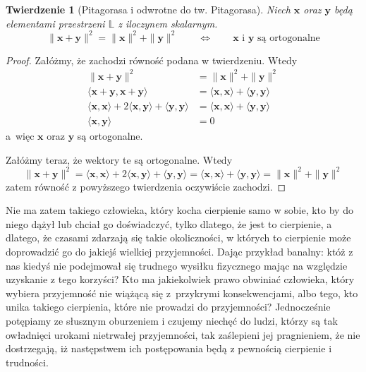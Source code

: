 \documentclass[12pt]{mwbk}
\theoremstyle{plain}
\newtheorem{twier}{Twierdzenie}[chapter] %
\theoremstyle{definition}
\theoremstyle{remark}
\newcommand{\xx}{\mathbf{x}}
\newcommand{\yy}{\mathbf{y}}
\newcommand{\skalar}[2]{\pmb{\langle}#1,#2\pmb{\rangle}}
\begin{document}
\begin{twier}[Pitagorasa i odwrotne do tw.
	Pitagorasa]\label{Pitagoras}
	Niech $\xx$ oraz $\yy$ będą elementami przestrzeni $\mathbb{L}$ z iloczynem
	skalarnym. 
	\[
	\|\xx+\yy\|^2=\|\xx\|^2 + \|\yy\|^2\qquad\iff\qquad
	\text{$\xx$ i $\yy$ są ortogonalne}
	\]
\end{twier}
\begin{proof}
	Załóżmy, że zachodzi równość podana w twierdzeniu. Wtedy
	\[
	\begin{aligned}
	\|\xx+\yy\|^2&=\|\xx\|^2+\|\yy\|^2\\
	\skalar{\xx+\yy}{\xx+\yy}
	&=\skalar{\xx}{\xx}+\skalar{\yy}{\yy}\\
	\skalar{\xx}{\xx}+2\skalar{\xx}{\yy}+\skalar{\yy}{\yy}
	&=\skalar{\xx}{\xx}+\skalar{\yy}{\yy}\\
	\skalar{\xx}{\yy}&=0
	\end{aligned}
	\]
	a~więc $\xx$ oraz $\yy$ są ortogonalne.

	Załóżmy teraz, że wektory te są ortogonalne. Wtedy
	\[
	\|\xx+\yy\|^2=
	\skalar{\xx}{\xx}+2\skalar{\xx}{\yy}+\skalar{\yy}{\yy}
	=\skalar{\xx}{\xx}+\skalar{\yy}{\yy}=
	\|\xx\|^2+\|\yy\|^2
	\]
	zatem równość z powyższego twierdzenia oczywiście zachodzi.
\end{proof}




Nie ma zatem takiego człowieka, który kocha cierpienie samo w sobie, 
kto by do niego dążył lub chciał go doświadczyć, tylko dlatego, że
jest to cierpienie, a dlatego, że czasami zdarzają się takie 
okoliczności, w których to cierpienie może doprowadzić 
go do jakiejś wielkiej przyjemności. 
Dając przykład banalny: któż z nas kiedyś nie podejmował 
się trudnego wysiłku fizycznego mając na względzie 
uzyskanie z tego korzyści? 
Kto ma jakiekolwiek prawo obwiniać człowieka, 
który wybiera przyjemność nie wiążącą się z~przykrymi 
konsekwencjami, albo tego, kto unika takiego cierpienia, 
które nie prowadzi do przyjemności? 
Jednocześnie potępiamy ze słusznym oburzeniem i czujemy 
niechęć do ludzi, którzy są tak owładnięci urokami nietrwałej 
przyjemności, tak zaślepieni jej pragnieniem, 
że nie dostrzegają, iż następstwem ich 
postępowania będą z pewnością cierpienie i trudności.
\end{document}
